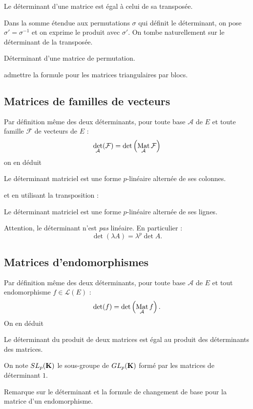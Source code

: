 \newpage
\begin{propn}
 Le déterminant d'une matrice est égal à celui de sa transposée.
\end{propn}
\begin{demo}
  Dans la somme étendue aux permutations $\sigma$ qui définit le déterminant, on pose $\sigma' = \sigma^{-1}$ et on exprime le produit avec $\sigma'$. On tombe naturellement sur le déterminant de la transposée.
\end{demo}

Déterminant d'une matrice de permutation.

admettre la formule pour les matrices triangulaires par blocs.
\newpage

\subsection{Matrices de familles de vecteurs}
Par définition même des deux déterminants, pour toute base $\mathcal A$ de $E$ et toute famille $\mathcal F$ de vecteurs de $E$ :
\begin{displaymath}
 \det_{\mathcal A}(\mathcal F) = \det \left( \mathop{\mathrm{Mat}}_{\mathcal A}\mathcal F\right) 
\end{displaymath}
on en déduit
\begin{propn}
Le déterminant matriciel est une forme $p$-linéaire alternée de ses colonnes.
\end{propn}
et en utilisant la transposition :
\begin{propn}
Le déterminant matriciel est une forme $p$-linéaire alternée de ses lignes. 
\end{propn}
Attention, le déterminant n'est \emph{pas} linéaire. En particulier :
\begin{displaymath}
 \det \left( \lambda A\right)  = \lambda^p \det A.
\end{displaymath}

\subsection{Matrices d'endomorphismes}
Par définition même des deux déterminants, pour toute base $\mathcal A$ de $E$ et tout endomorphisme $f \in \mathcal L(E)$ :
\begin{displaymath}
 \det(f) = \det \left( \mathop{\mathrm{Mat}}_{\mathcal A}f\right). 
\end{displaymath}
On en déduit
\begin{propn}
 Le déterminant du produit de deux matrices est égal au produit des déterminants des matrices. 
\end{propn}
\begin{defi}
 On note $SL_p(\mathbf{K})$ le sous-groupe de $GL_p(\mathbf{K})$ formé par les matrices de déterminant $1$.
\end{defi}
Remarque sur le déterminant et la formule de changement de base pour la matrice d'un endomorphisme.
\clearpage
